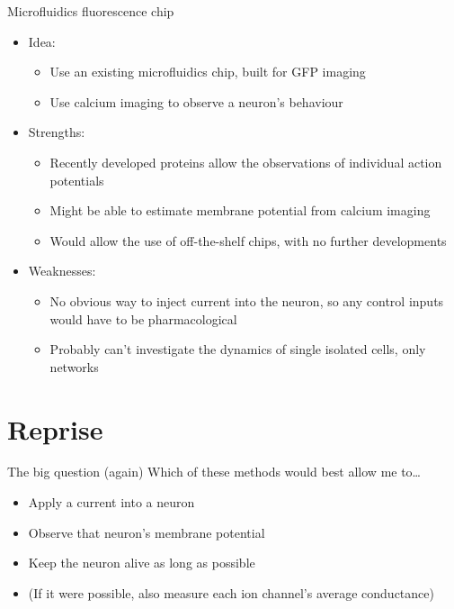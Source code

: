\documentclass[aspectratio=169]{beamer}
\begin{document}
\begin{frame}[label={sec:orgd394775}]{Microfluidics fluorescence chip}
\begin{itemize}
\item Idea:
\begin{itemize}
\item Use an existing microfluidics chip, built for GFP imaging
\item Use calcium imaging to observe a neuron's behaviour
\end{itemize}

\item Strengths:
\begin{itemize}
\item Recently developed proteins allow the observations of individual action potentials
\item Might be able to estimate membrane potential from calcium imaging
\item Would allow the use of off-the-shelf chips, with no further developments
\end{itemize}

\item Weaknesses:
\begin{itemize}
\item No obvious way to inject current into the neuron, so any control inputs would have to be pharmacological
\item Probably can't investigate the dynamics of single isolated cells, only networks
\end{itemize}
\end{itemize}
\end{frame}


\section{Reprise}
\label{sec:orgfa0337e}
\begin{frame}[label={sec:org43dcf2c}]{The big question (again)}
Which of these methods would best allow me to\ldots{}
\begin{itemize}
\item Apply a current into a neuron
\item Observe that neuron's membrane potential
\item Keep the neuron alive as long as possible
\item (If it were possible, also measure each ion channel's average conductance)
\end{itemize}
\end{frame}
\end{document}
